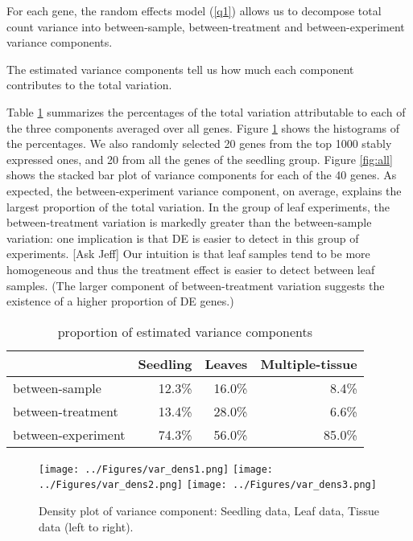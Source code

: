 \documentclass[11pt, a4paper]{article}
\begin{document}
For each gene, the random effects model (\ref{q1}) allows us to decompose
total count variance into between-sample, between-treatment and
between-experiment variance components. 

The estimated variance components tell us how much each component contributes
to the total variation.  

Table \ref{table:percentageofvariation} summarizes the percentages of the
total variation attributable to each of the three components averaged over all
genes.  Figure \ref{fig:densityplot} shows the histograms of the percentages. We also randomly selected 20 genes from the top 1000 stably expressed ones, and 20 from all the genes of the seedling group. 
Figure \ref{fig:all} shows the stacked bar plot of variance components for each of the 40 genes.
As expected, the between-experiment variance component, on average,
explains the largest proportion of the total variation. In the group of leaf
experiments, the between-treatment variation is markedly greater than the
between-sample variation: one implication is that DE is easier to detect in
this group of experiments.  [Ask Jeff] Our intuition is
that leaf samples tend to be more homogeneous and thus the treatment effect is
easier to detect between leaf samples. (The larger component of
between-treatment variation suggests the existence of a higher proportion of
DE genes.) 


 
 \begin{center}
 \begin{table}[h!]
 	\centering
 	\caption{proportion of estimated variance components}
	 \label{table:percentageofvariation}
 	\begin{tabular}{lrrr}\hline
 		& Seedling & Leaves & Multiple-tissue \\  \hline
 		between-sample     & 12.3\%   & 16.0\% & 8.4\%           \\
 		between-treatment  & 13.4\%   & 28.0\% & 6.6\%           \\
 		between-experiment & 74.3\%   & 56.0\% & 85.0\%         \\ \hline
 	\end{tabular}
 \end{table}
\end{center}

 
 \begin{figure}[h]
\begin{center}
\texttt{[image: ../Figures/var\_dens1.png]}
\texttt{[image: ../Figures/var\_dens2.png]}
\texttt{[image: ../Figures/var\_dens3.png]}
\caption{ Density plot of variance component: Seedling data, Leaf data, Tissue data (left to right).}
\label{fig:densityplot}
\end{center}
\end{figure} 
\end{document}
